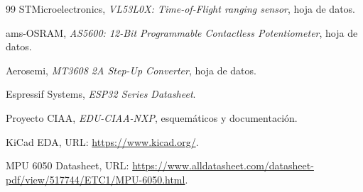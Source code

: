 \documentclass[12pt,a4paper]{article}
\begin{document}
\begin{thebibliography}{99}
STMicroelectronics, \textit{VL53L0X: Time-of-Flight ranging sensor}, hoja de datos.

ams-OSRAM, \textit{AS5600: 12-Bit Programmable Contactless Potentiometer}, hoja de datos.

Aerosemi, \textit{MT3608 2A Step-Up Converter}, hoja de datos.

Espressif Systems, \textit{ESP32 Series Datasheet}.

Proyecto CIAA, \textit{EDU-CIAA-NXP}, esquemáticos y documentación.

KiCad EDA, URL: \url{https://www.kicad.org/}.

MPU 6050 Datasheet, URL: \url{https://www.alldatasheet.com/datasheet-pdf/view/517744/ETC1/MPU-6050.html}.



\end{thebibliography}

\newpage

\end{document}
